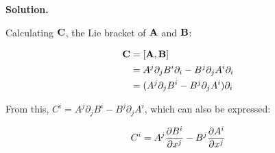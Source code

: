 \documentclass[10pt]{article}
\begin{document}
\begin{enumerate}[start=1,label={\bfseries Exercise \arabic*:},leftmargin=1in]
        \textbf{Solution.}

        Calculating \(\vb{C}\), the Lie bracket of \(\vb{A}\) and \(\vb{B}\):

        \begin{align*}
            \vb{C} &= [\vb{A}, \vb{B}] \\
              &= A^j \partial_j B^i \partial_i - B^j \partial_j A^i \partial_i \\
              &= ( A^j \partial_j B^i - B^j \partial_j A^i ) \partial_i \\
        \end{align*}

        From this, \(C^i = A^j \partial_j B^i - B^j \partial_j A^i \), which can also be expressed:

        \begin{equation*}
            C^i = A^j \pdv{B^i}{x^j} - B^j \pdv{A^i}{x^j}
        \end{equation*}


\end{enumerate}
\end{document}
